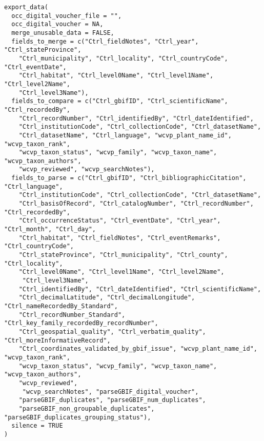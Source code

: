 \documentclass[a4paper]{book}
\begin{document}
\begin{Usage}
\begin{verbatim}
export_data(
  occ_digital_voucher_file = "",
  occ_digital_voucher = NA,
  merge_unusable_data = FALSE,
  fields_to_merge = c("Ctrl_fieldNotes", "Ctrl_year", "Ctrl_stateProvince",
    "Ctrl_municipality", "Ctrl_locality", "Ctrl_countryCode", "Ctrl_eventDate",
    "Ctrl_habitat", "Ctrl_level0Name", "Ctrl_level1Name", "Ctrl_level2Name",
    "Ctrl_level3Name"),
  fields_to_compare = c("Ctrl_gbifID", "Ctrl_scientificName", "Ctrl_recordedBy",
    "Ctrl_recordNumber", "Ctrl_identifiedBy", "Ctrl_dateIdentified",
    "Ctrl_institutionCode", "Ctrl_collectionCode", "Ctrl_datasetName",
    "Ctrl_datasetName", "Ctrl_language", "wcvp_plant_name_id", "wcvp_taxon_rank",
    "wcvp_taxon_status", "wcvp_family", "wcvp_taxon_name", "wcvp_taxon_authors",
    "wcvp_reviewed", "wcvp_searchNotes"),
  fields_to_parse = c("Ctrl_gbifID", "Ctrl_bibliographicCitation", "Ctrl_language",
    "Ctrl_institutionCode", "Ctrl_collectionCode", "Ctrl_datasetName",
    "Ctrl_basisOfRecord", "Ctrl_catalogNumber", "Ctrl_recordNumber", "Ctrl_recordedBy",
    "Ctrl_occurrenceStatus", "Ctrl_eventDate", "Ctrl_year", "Ctrl_month", "Ctrl_day",
    "Ctrl_habitat", "Ctrl_fieldNotes", "Ctrl_eventRemarks", "Ctrl_countryCode",
    "Ctrl_stateProvince", "Ctrl_municipality", "Ctrl_county", "Ctrl_locality",
    "Ctrl_level0Name", "Ctrl_level1Name", "Ctrl_level2Name", 
     "Ctrl_level3Name",
    "Ctrl_identifiedBy", "Ctrl_dateIdentified", "Ctrl_scientificName",
    "Ctrl_decimalLatitude", "Ctrl_decimalLongitude", "Ctrl_nameRecordedBy_Standard",
    "Ctrl_recordNumber_Standard", "Ctrl_key_family_recordedBy_recordNumber",
    "Ctrl_geospatial_quality", "Ctrl_verbatim_quality", "Ctrl_moreInformativeRecord",
    "Ctrl_coordinates_validated_by_gbif_issue", "wcvp_plant_name_id", "wcvp_taxon_rank",
    "wcvp_taxon_status", "wcvp_family", "wcvp_taxon_name", "wcvp_taxon_authors",
    "wcvp_reviewed", 
     "wcvp_searchNotes", "parseGBIF_digital_voucher",
    "parseGBIF_duplicates", "parseGBIF_num_duplicates",
    "parseGBIF_non_groupable_duplicates", "parseGBIF_duplicates_grouping_status"),
  silence = TRUE
)
\end{verbatim}
\end{Usage}
%
\end{document}
